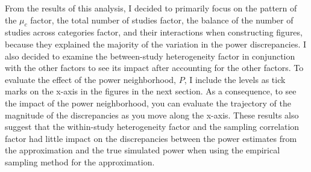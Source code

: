 From the results of this analysis, I decided to primarily focus on the pattern of the $\mu_c$ factor, the total number of studies factor, the balance of the number of studies across categories factor, and their interactions when constructing figures, because they explained the majority of the variation in the power discrepancies. I also decided to examine the between-study heterogeneity factor in conjunction with the other factors to see its impact after accounting for the other factors. To evaluate the effect of the power neighborhood, $P$, I include the levels as tick marks on the x-axis in the figures in the next section. As a consequence, to see the impact of the power neighborhood, you can evaluate the trajectory of the magnitude of the discrepancies as you move along the x-axis. These results also suggest that the within-study heterogeneity factor and the sampling correlation factor had little impact on the discrepancies between the power estimates from the approximation and the true simulated power when using the empirical sampling method for the approximation. 


